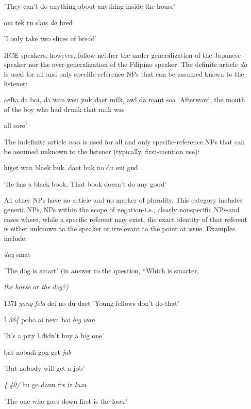 'They can't do anything about anything inside the house'

\ea\label{ex:33}
 oni tek tu slais \textit{da} bred
\glt
\z

'I only take two slices of bread'

HCE speakers, however, follow neither the under-generalization of the Japanese speaker nor the over-generalization of the Filipino speaker. The definite article \textit{da} is used for all and only specific-refer\-ence NPs that can be assumed known to the listener:

\ea\label{ex:34}
 aefta da boi, da wan wen jink daet milk, awl da maut soa 'Afterward, the mouth of the boy who had drunk that milk was
\glt
\z

all sore'

The indefinite article \textit{wan} is used for all and only specific-reference NPs that can be assumed unknown to the listener (typically, first-mention use):

\ea\label{ex:35}
 higet wan blaek buk. daet buk no du eni gud
\glt
\z

'He has a black book. That book doesn't do any good'

All other NPs have no article and no marker of plurality. This category includes generic NPs, NPs within the scope of negation-i.e., clearly nonspecific NPs-and cases where, while a specific referent may exist, the exact identity of that referent is either unknown to the speaker or irrelevant to the point at issue. Examples include:

\ea\label{ex:36}
 \textit{dag} smat
\glt
\z

'The dog is smart' (in answer to the question, ``Which is smarter,

\textit{the} \textit{horse} or \textit{the} \textit{dog?{\textquotedbl})}

137I \textit{ya}\textit{n}\textit{g} \textit{fela} dei no du daet 'Young fellows don't do that'


I \textit{38\{ }poho ai neva bai \textit{big} \textit{wan}

'It's a pity l didn't buy a big one'

\ea\label{ex:39}
 bat nobadi gon get \textit{jab}
\glt
\z

'But nobody will get a job'

\textit{\{} \textit{40/ }hu go daun frs iz \textit{luza}

'The one who goes down first is the loser'

